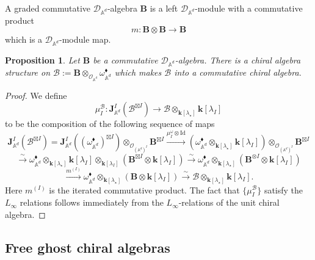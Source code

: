 \documentclass[11pt]{amsart}
\newtheorem{prop}[thm]{Proposition}
\theoremstyle{definition}
\theoremstyle{remark}
\numberwithin{equation}{section}
\begin{document}
A graded commutative $\mathcal{D}_{\mathbb{A}^d}$-algebra $\mathbf{B}$ is a left $\mathcal{D}_{\mathbb{A}^d}$-module with a commutative product
$$
m\colon\mathbf{B}\otimes\mathbf{B}\rightarrow \mathbf{B}
$$
which is a $\mathcal{D}_{\mathbb{A}^d}$-module map.
\begin{prop}\label{prop:commop}
  Let $\mathbf{B}$ be a commutative $\mathcal{D}_{\mathbb{A}^d}$-algebra.
  There is a chiral algebra structure on $\mathcal{B}:=\mathbf{B}\otimes_{\mathcal{O}_{\mathbb{A}^d}} \omega_{\mathbb{A}^d}^{\blacklozenge}$ which makes $\mathcal{B}$ into a commutative chiral algebra.
\end{prop}
\begin{proof}
  We define
  $$
  \mu^{\mathcal{B}}_{{I}}:\mathbf{J}^{{I}}_{\mathbb{A}^d}(\mathcal{B}^{\boxtimes I})\rightarrow \mathcal{B}\otimes_{\mathbf{k}[\lambda_{\star}]}\mathbf{k}[\lambda_{I}]
  $$
  to be the composition of the following sequence of maps
  $$
\mathbf{J}^{{I}}_{\mathbb{A}^d}(\mathcal{B}^{\boxtimes{I}})=  \mathbf{J}^{{I}}_{\mathbb{A}^d}((\omega_{\mathbb{A}^d}^{\blacklozenge})^{\boxtimes I})\otimes_{\mathcal{O}_{(\mathbb{A}^d)^I}} \mathbf{B}^{\boxtimes{I}}\xrightarrow{\mu^{\omega}_{{I}}\otimes \mathrm{Id}}\left(\omega_{\mathbb{A}^d}^{\blacklozenge}\otimes_{\mathbf{k}[\lambda_{\star}]}\mathbf{k}[\lambda_{I}]\right)\otimes_{\mathcal{O}_{(\mathbb{A}^d)^I}}\mathbf{B}^{\boxtimes{I}}
  $$
  $$
  \xrightarrow{\sim}\omega_{\mathbb{A}^d}^{\blacklozenge}\otimes_{\mathbf{k}[\lambda_{\star}]}\mathbf{k}[\lambda_{I}]\otimes_{\mathbf{k}[\lambda_{I}]} \left( \mathbf{B}^{\boxtimes I}\otimes \mathbf{k}[\lambda_{I}]\right)  \xrightarrow{\sim}\omega_{\mathbb{A}^d}^{\blacklozenge}\otimes_{\mathbf{k}[\lambda_{\star}]} \left( \mathbf{B}^{\otimes{I}}\otimes \mathbf{k}[\lambda_{I}]\right)
  $$
  $$
  \xrightarrow{m^{({I})}}\omega_{\mathbb{A}^d}^{\blacklozenge}\otimes_{\mathbf{k}[\lambda_{\star}]} \left( \mathbf{B}\otimes \mathbf{k}[\lambda_{I}]\right)\xrightarrow{\sim}\mathcal{B}\otimes_{\mathbf{k}[\lambda_{\star}]}\mathbf{k}[\lambda_{I}].
  $$
 Here $m^{(I)}$ is the iterated commutative product. The fact that $\{\mu_I^{\mathcal{B}}\}$ satisfy the $L_\infty$ relations follows immediately from the
  $L_\infty$-relations of the unit chiral algebra.
\end{proof}

\subsection{Free ghost chiral algebras}
\end{document}
